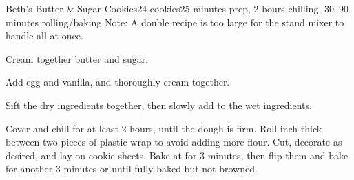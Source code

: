 \documentclass[../Cookbook.tex]{subfiles}
\begin{document}
\begin{recipe}{Beth's Butter \& Sugar Cookies}{24 cookies}{25 minutes prep, 2 hours chilling, 30--90 minutes rolling/baking}
	Note: A double recipe is too large for the stand mixer to handle all at once.

	Cream together butter and sugar.

	Add egg and vanilla, and thoroughly cream together.

	Sift the dry ingredients together, then slowly add to the wet ingredients.

	\newstep
	Cover and chill for at least 2 hours, until the dough is firm. Roll  inch thick between two pieces of plastic wrap to avoid adding more flour. Cut, decorate as desired, and lay on cookie sheets. Bake at  for
	3 minutes, then flip them and bake for another 3 minutes %
	or until fully baked but not browned.

\end{recipe}
\end{document}
